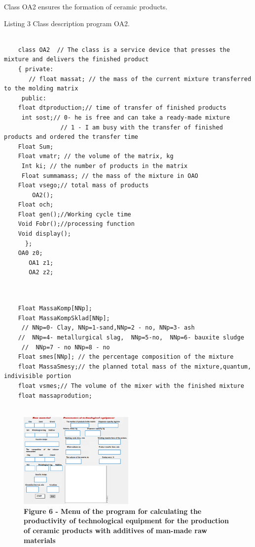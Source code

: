 Class OA2 ensures the formation of ceramic products.

Listing 3 Class description program OA2.

\begin{lstlisting}

	class OA2  // The class is a service device that presses the mixture and delivers the finished product
	{ private:
	   // float massat; // the mass of the current mixture transferred to the molding matrix
	 public:
	float dtproduction;// time of transfer of finished products
	 int sost;// 0- he is free and can take a ready-made mixture
				// 1 - I am busy with the transfer of finished products and ordered the transfer time
	Float Sum;
	Float vmatr; // the volume of the matrix, kg
	 Int ki; // the number of products in the matrix
	 Float summamass; // the mass of the mixture in ОАО
	Float vsego;// total mass of products
		OA2();
	Float och;
	Float gen();//Working cycle time
	Void Fobr();//processing function
	Void display();
	  };
	OA0 z0;
	   OA1 z1;
	   OA2 z2;
	

\end{lstlisting}

\begin{lstlisting}

	Float MassaKomp[NNp];
	Float MassaKompSklad[NNp];
	 // NNp=0- Clay, NNp=1-sand,NNp=2 - no, NNp=3- ash
	//  NNp=4- metallurgical slag,  NNp=5-no,  NNp=6- bauxite sludge 
	 //  NNp=7 - no NNp=8 - no
	Float smes[NNp]; // the percentage composition of the mixture
	float MassaSmesy;// the planned total mass of the mixture,quantum, indivisible portion
	float vsmes;// The volume of the mixer with the finished mixture
	float massaprodution;
	
\end{lstlisting}


\begin{figure}[H]
	\centering
	\includegraphics[width=0.5\textwidth]{assets/272}
	\caption*{\bfseries Figure 6 - Menu of the program for calculating the productivity of technological equipment for the production of ceramic
	products with additives of man-made raw materials}
\end{figure}



